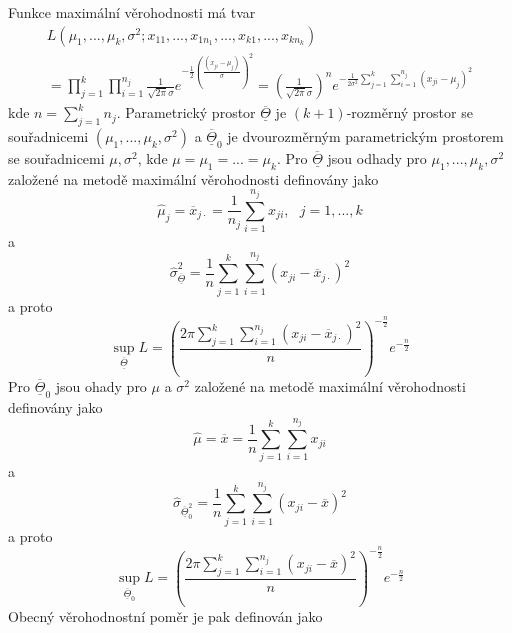 Funkce maximální věrohodnosti má tvar
\begin{multline*}
L(\mu_1, ..., \mu_k, \sigma^2; x_{11}, ..., x_{1n_1}, ..., x_{k1}, ..., x_{kn_k})\\
= \prod_{j = 1}^k \prod_{i = 1}^{n_j} \frac{1}{\sqrt{2 \pi} \sigma}e^{-\frac{1}{2}\left(\frac{(x_{ji} - \mu_j)}{\sigma}\right)^2} = \left(\frac{1}{\sqrt{2 \pi} \sigma}\right)^n e^{-\frac{1}{2 \sigma^2}\sum_{j = 1}^k \sum_{i = 1}^{n_j}(x_{ji} - \mu_j)^2}
\end{multline*}
kde $n = \sum_{j = 1}^k n_j$. Parametrický prostor $\overline{\underline{\Theta}}$ je $(k+1)$-rozměrný prostor se souřadnicemi $(\mu_1, ..., \mu_k, \sigma^2)$ a $\overline{\underline{\Theta}}_0$ je dvourozměrným parametrickým prostorem se souřadnicemi $\mu, \sigma^2$, kde $\mu = \mu_1 = ... = \mu_k$. Pro $\overline{\underline{\Theta}}$ jsou odhady pro $\mu_1, ..., \mu_k, \sigma^2$ založené na metodě maximální věrohodnosti definovány jako
\begin{equation*}
\hat{\mu}_j = \overline{x}_{j \cdot} = \frac{1}{n_j} \sum_{i = 1}^{n_j}x_{ji}, ~~~ j = 1, ..., k
\end{equation*}
a
\begin{equation*}
\hat{\sigma}_{\overline{\underline{\Theta}}}^2 = \frac{1}{n}\sum_{j = 1}^k \sum_{i = 1}^{n_j}(x_{ji} - \overline{x}_{j \cdot})^2
\end{equation*}
a proto
\begin{equation*}
\sup_{\overline{\underline{\Theta}}}L = \left(\frac{2 \pi \sum_{j = 1}^k \sum_{i = 1}^{n_j} (x_{ji} - \overline{x}_{j\cdot})^2}{n}\right)^{-\frac{n}{2}}e^{-\frac{n}{2}}
\end{equation*}
Pro $\overline{\underline{\Theta}}_0$ jsou ohady pro $\mu$ a $\sigma^2$ založené na metodě maximální věrohodnosti definovány jako
\begin{equation*}
\hat{\mu} = \overline{x} = \frac{1}{n}\sum_{j = 1}^k \sum_{i = 1}^{n_j}x_{ji}
\end{equation*}
a
\begin{equation*}
\hat{\sigma}_{\overline{\underline{\Theta}}_0^2} = \frac{1}{n}\sum_{j = 1}^k \sum_{i = 1}^{n_j}(x_{ji} - \overline{x})^2
\end{equation*}
a proto
\begin{equation*}
\sup_{\overline{\underline{\Theta}}_0} L = \left(\frac{2 \pi \sum_{j = 1}^k \sum_{i = 1}^{n_j}(x_{ji} - \overline{x})^2}{n}\right)^{-\frac{n}{2}}e^{-\frac{n}{2}}
\end{equation*}
Obecný věrohodnostní poměr je pak definován jako
